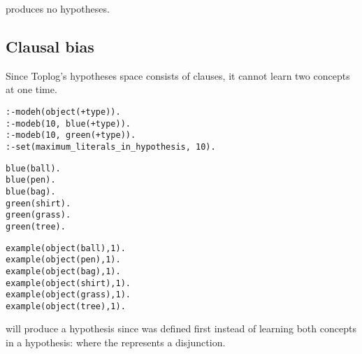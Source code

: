 produces no hypotheses.

\subsection{Clausal bias}
Since Toplog's hypotheses space consists of clauses, it cannot learn two concepts at one time.

\begin{lstlisting}
:-modeh(object(+type)).
:-modeb(10, blue(+type)).
:-modeb(10, green(+type)).
:-set(maximum_literals_in_hypothesis, 10).
\end{lstlisting}

\begin{minipage}[t]{.35\textwidth}
\begin{lstlisting}
blue(ball).
blue(pen).
blue(bag).
green(shirt).
green(grass).
green(tree).\end{lstlisting}
\end{minipage}
\begin{minipage}[t]{.20\textwidth}
\begin{lstlisting}
example(object(ball),1).
example(object(pen),1).
example(object(bag),1).
example(object(shirt),1).
example(object(grass),1).
example(object(tree),1).
\end{lstlisting}
\end{minipage}

will produce a hypothesis  since 
 was defined first instead of learning both
concepts in a hypothesis:
 where the \tc{;} represents a disjunction.
